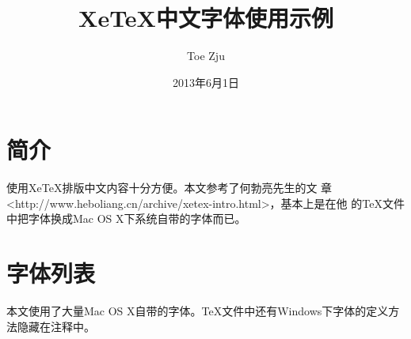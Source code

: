 \documentclass[12pt,a4paper]{article}
\begin{document}
\title{\whei XeTeX中文字体使用示例}
\author{\kai Toe Zju}
\date{\kai 2013年6月1日}

\maketitle

\section{简介}
使用XeTeX排版中文内容十分方便。本文参考了何勃亮先生的文
章<http://www.heboliang.cn/archive/xetex-intro.html>，基本上是在他
的TeX文件中把字体换成Mac OS X下系统自带的字体而已。

\section{字体列表}
本文使用了大量Mac OS X自带的字体。TeX文件中还有Windows下字体的定义方法隐藏在注释中。
\end{document}
